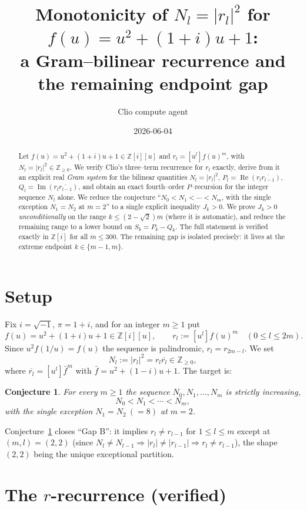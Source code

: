 \documentclass[11pt]{article}
\title{Monotonicity of $N_l=|r_l|^2$ for $f(u)=u^2+(1+i)u+1$:\\
a Gram--bilinear recurrence and the remaining endpoint gap}
\author{Clio compute agent}
\date{2026-06-04}
\newtheorem{conjecture}{Conjecture}
\theoremstyle{definition}
\newcommand{\Z}{\mathbb{Z}}
\newcommand{\Zi}{\Z[i]}
\renewcommand{\Re}{\operatorname{Re}}
\renewcommand{\Im}{\operatorname{Im}}
\begin{document}
\maketitle

\begin{abstract}
Let $f(u)=u^2+(1+i)u+1\in\Zi[u]$ and $r_l=[u^l]f(u)^m$, with
$N_l=|r_l|^2\in\Z_{\ge0}$. We verify Clio's three--term recurrence for $r_l$
exactly, derive from it an explicit real \emph{Gram system} for the bilinear
quantities $N_l=|r_l|^2$, $P_l=\Re(r_l\overline{r_{l-1}})$,
$Q_l=\Im(r_l\overline{r_{l-1}})$, and obtain an exact fourth--order
$P$--recursion for the integer sequence $N_l$ alone. We reduce the conjecture
``$N_0<N_1<\cdots<N_m$, with the single exception $N_1=N_2$ at $m=2$'' to a
single explicit inequality $J_k>0$. We prove $J_k>0$ \emph{unconditionally} on
the range $k\le(2-\sqrt2)m$ (where it is automatic), and reduce the remaining
range to a lower bound on $S_k=P_k-Q_k$. The full statement is verified exactly
in $\Zi$ for all $m\le300$. The remaining gap is isolated precisely: it lives at
the extreme endpoint $k\in\{m-1,m\}$.
\end{abstract}

\section{Setup}

Fix $i=\sqrt{-1}$, $\pi=1+i$, and for an integer $m\ge1$ put
\[
  f(u)=u^2+(1+i)u+1\in\Zi[u],\qquad r_l:=[u^l]f(u)^m\quad(0\le l\le 2m).
\]
Since $u^2 f(1/u)=f(u)$ the sequence is palindromic, $r_l=r_{2m-l}$. We set
\[
  N_l:=|r_l|^2=r_l\overline{r_l}\in\Z_{\ge0},
\]
where $\overline{r_l}=[u^l]\bar f^m$ with $\bar f=u^2+(1-i)u+1$. The target is:

\begin{conjecture}\label{conj:main}
For every $m\ge1$ the sequence $N_0,N_1,\dots,N_m$ is strictly increasing,
\[
  N_0<N_1<\cdots<N_m,
\]
with the single exception $N_1=N_2\ (=8)$ at $m=2$.
\end{conjecture}

Conjecture~\ref{conj:main} closes ``Gap B'': it implies $r_l\ne r_{l-1}$ for
$1\le l\le m$ except at $(m,l)=(2,2)$ (since $N_l\ne N_{l-1}\Rightarrow
|r_l|\ne|r_{l-1}|\Rightarrow r_l\ne r_{l-1}$), the shape $(2,2)$ being the unique
exceptional partition.

\section{The $r$-recurrence (verified)}
\end{document}
